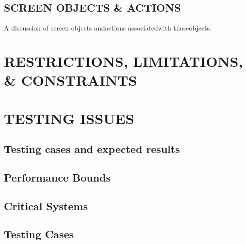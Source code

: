 \documentclass[twoside,letterpaper]{article}
\begin{document}
\subsection[SCREEN OBJECTS \& ACTIONS]{\rmfamily\bfseries\color{black}
SCREEN OBJECTS \& ACTIONS}
{\rmfamily\color{black}
A discussion of screen objects andactions associatedwith thoseobjects.
}

\clearpage\section[RESTRICTIONS, LIMITATIONS, \& CONSTRAINTS]{\rmfamily\bfseries\color{black}RESTRICTIONS, LIMITATIONS, \& CONSTRAINTS}

\clearpage\section[TESTING ISSUES ]{\rmfamily\bfseries\color{black}
TESTING ISSUES}

\subsection[Testing cases and expected results]{\rmfamily\bfseries\color{black}
Testing cases and expected results}


\subsection[Performance Bounds]{\rmfamily\bfseries\color{black}
Performance Bounds}


\subsection[Critical Systems]{\rmfamily\bfseries\color{black}
Critical Systems}


\subsection[Testing Cases]{\rmfamily\bfseries\color{black}
Testing Cases}


\bigskip
\end{document}

